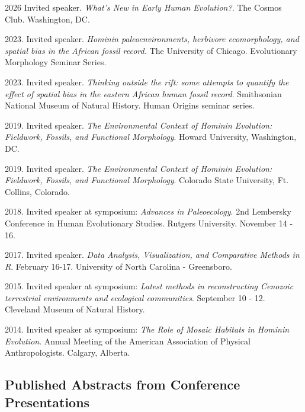 \documentclass{article}
\begin{document}
\begin{etaremune}

\item 2026 Invited speaker. \emph{What's New in Early Human Evolution?}. The Cosmos Club. Washington, DC.%

\item 2023. Invited speaker. \emph{Hominin paleoenvironments, herbivore ecomorphology, and spatial bias in the African fossil record.} The University of Chicago. Evolutionary Morphology Seminar Series. 

\item 2023. Invited speaker.  \emph{Thinking outside the rift: some attempts to quantify the effect of spatial bias in the eastern African human fossil record}. Smithsonian National Museum of Natural History. Human Origins seminar series.  

\item 2019. Invited speaker. \emph{The Environmental Context of Hominin Evolution: Fieldwork, Fossils, and Functional Morphology}. Howard University, Washington, DC.

\item 2019. Invited speaker. \emph{The Environmental Context of Hominin Evolution: Fieldwork, Fossils, and Functional Morphology}. Colorado State University, Ft. Collins, Colorado.


\item 2018. Invited speaker at symposium: \emph{Advances in Paleoecology}. 2nd Lembersky Conference in Human Evolutionary Studies. Rutgers University. November 14 - 16.

\item 2017. Invited speaker. \emph{Data Analysis, Visualization, and Comparative Methods in R}. February 16-17. University of North Carolina - Greensboro.

\item 2015. Invited speaker at symposium: \emph{Latest methods in reconstructing Cenozoic terrestrial environments and ecological communities}. September 10 - 12. Cleveland Museum of Natural History.

\item 2014. Invited speaker at symposium: \emph{The Role of Mosaic Habitats in Hominin Evolution}. Annual Meeting of the American Association of Physical Anthropologists. Calgary, Alberta.
\end{etaremune}


\subsection*{Published Abstracts from Conference Presentations}
\end{document}

